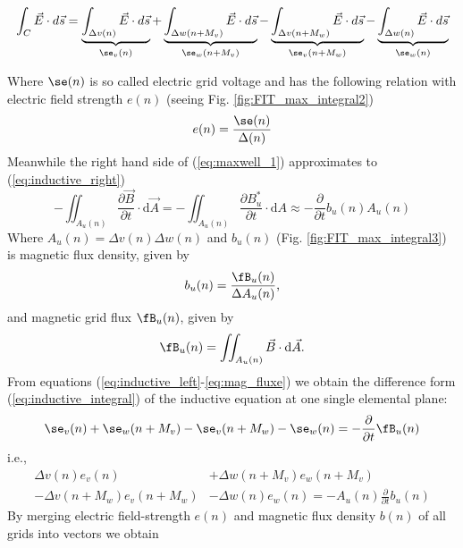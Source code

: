 \begin{equation}
\int_{C}\vec{E}\cdot d\vec{s}
=\underbrace{\int_{\Delta v(n)}\vec{E}\cdot d\vec{s}}_{\se_{v}(n)}
+\underbrace{\int_{\Delta w(n+M_{v})}\vec{E}\cdot d\vec{s}}_{\se_{w}(n+M_{v})}
-\underbrace{\int_{\Delta v(n+M_{w})}\vec{E}\cdot d\vec{s}}_{\se_{v}(n+M_{w})}
-\underbrace{\int_{\Delta w(n)}\vec{E}\cdot d\vec{s}}_{\se_{w}(n)}
\label{eq:inductive_left}
\end{equation}

Where $\se(n)$ is so called  electric grid voltage and has the following relation with electric field strength $e(n)$ (seeing Fig. \ref{fig:FIT_max_integral2})
\begin{equation}
 e(n)=\frac{\se(n)}{\Delta(n)}
\label{eq:e_field}
\end{equation}
Meanwhile the right hand side of (\ref{eq:maxwell_1}) approximates to (\ref{eq:inductive_right})
\begin{equation}
-\iint_{A_{u}(n)}\frac{\partial\vec{B}}{\partial t}\cdot\mathrm{d}\vec{A} 
=-\iint_{A_{u}(n)}\frac{\partial B^{*}_{u}}{\partial t}\cdot\mathrm{d}A
\approx -\frac{\partial}{\partial t}b_{u}(n)A_{u}(n)
\label{eq:inductive_right}
\end{equation}
Where $A_{u}(n)=\Delta v(n)\Delta w(n)$ and $b_{u}(n)$ (Fig. \ref{fig:FIT_max_integral3}) is magnetic flux density, given by
\begin{equation}
 b_{u}(n)=\frac{\fB_{u}(n)}{\Delta A_{u}(n)} \text{,}
\label{eq:b_flux_density}
\end{equation}
 and magnetic grid flux $\fB_{u}(n)$, given by
\begin{equation}
\fB_{u}(n)=\iint_{A_{u}(n)}\vec{B}\cdot\mathrm{d}\vec{A} \text{.}
\label{eq:mag_fluxe}
\end{equation}
From equations (\ref{eq:inductive_left}-\ref{eq:mag_fluxe}) we obtain the difference form (\ref{eq:inductive_integral}) of the inductive equation at one single elemental plane:
\begin{equation}
\se_{v}(n)+\se_{w}(n+M_{v})-\se_{v}(n+M_{w})-\se_{w}(n)=-\frac{\partial}{\partial t}\fB_{u}(n)
\label{eq:inductive_integral}
\end{equation}
i.e.,
\begin{align}
\Delta v(n)e_{v}(n)&+\Delta w(n+M_{v})e_{w}(n+M_{v})\nonumber\\
-\Delta v(n+M_{w})e_{v}(n+M_{w})&-\Delta w(n)e_{w}(n)=-A_{u}(n)\frac{\partial}{\partial{t}}b_{u}(n) 
\label{eq:inductive_sample}
\end{align}
By merging electric field-strength $e(n)$ and magnetic flux density $b(n)$ of all grids into vectors we obtain
